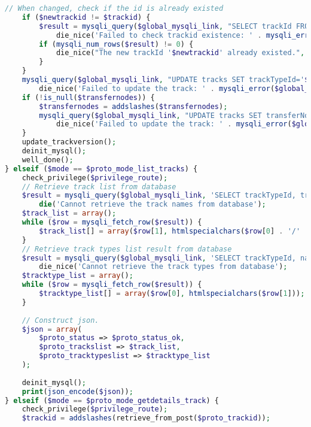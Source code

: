 \documentclass[a4paper,twoside]{article}
\begin{document}
\begin{lstlisting}[language=PHP,basicstyle=\tiny,caption=handle.php,label={lst:handle.php}]
	// When changed, check if the id is already existed
	if ($newtrackid != $trackid) {
		$result = mysqli_query($global_mysqli_link, "SELECT trackId FROM tracks WHERE trackId='$newtrackid'") or
			die_nice('Failed to check trackid existence: ' . mysqli_error($global_mysqli_link), true);
		if (mysqli_num_rows($result) != 0) {
			die_nice("The new trackId '$newtrackid' already existed.", true);
		}
	}
	mysqli_query($global_mysqli_link, "UPDATE tracks SET trackTypeId='$tracktype', trackId='$newtrackid', trackName='$trackname', internalInfo='$internalinfo', pathloop='$pathloop', penalty='$penalty' WHERE trackId='$trackid'") or
		die_nice('Failed to update the track: ' . mysqli_error($global_mysqli_link));
	if (!is_null($transfernodes)) {
		$transfernodes = addslashes($transfernodes);
		mysqli_query($global_mysqli_link, "UPDATE tracks SET transferNodes='$transfernodes'WHERE trackId='$trackid'") or
			die_nice('Failed to update the track: ' . mysqli_error($global_mysqli_link));
	}
	update_trackversion();
	deinit_mysql();
	well_done();
} elseif ($mode == $proto_mode_list_tracks) {
	check_privilege($privilege_route);
	// Retrieve track list from database
	$result = mysqli_query($global_mysqli_link, 'SELECT trackTypeId, trackId, trackName FROM tracks ORDER BY trackTypeId, trackId') or
		die('Cannot retrieve the track names from database');
	$track_list = array();	
	while ($row = mysqli_fetch_row($result)) {
		$track_list[] = array($row[1], htmlspecialchars($row[0] . '/' . $row[2]));
	}
	// Retrieve track types list result from database
	$result = mysqli_query($global_mysqli_link, 'SELECT trackTypeId, name FROM tracktypes ORDER BY trackTypeId') or
		die_nice('Cannot retrieve the track types from database');
	$tracktype_list = array();
	while ($row = mysqli_fetch_row($result)) {
		$tracktype_list[] = array($row[0], htmlspecialchars($row[1]));
	}
	
	// Construct json.
	$json = array(
		$proto_status => $proto_status_ok,
		$proto_trackslist => $track_list,
		$proto_tracktypeslist => $tracktype_list
	);
	
	deinit_mysql();
	print(json_encode($json));
} elseif ($mode == $proto_mode_getdetails_track) {
	check_privilege($privilege_route);
	$trackid = addslashes(retrieve_from_post($proto_trackid));


\end{lstlisting}
\end{document}
